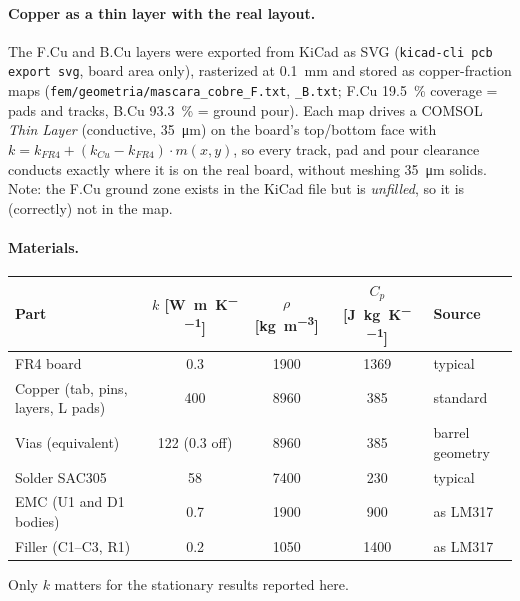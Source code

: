 \documentclass[11pt,letterpaper]{article}
\begin{document}
\paragraph{Copper as a thin layer with the real layout.} The F.Cu and B.Cu layers were exported from KiCad
as SVG (\texttt{kicad-cli pcb export svg}, board area only), rasterized at \SI{0.1}{\milli\meter} and
stored as copper-fraction maps (\nolinkurl{fem/geometria/mascara_cobre_F.txt}, \texttt{\_B.txt}; F.Cu
\SI{19.5}{\percent} coverage = pads and tracks, B.Cu \SI{93.3}{\percent} = ground pour). Each map drives a
COMSOL \textit{Thin Layer} (conductive, \SI{35}{\micro\meter}) on the board's top/bottom face with
$k = k_{FR4} + (k_{Cu}-k_{FR4})\cdot m(x,y)$, so every track, pad and pour clearance conducts exactly where
it is on the real board, without meshing \SI{35}{\micro\meter} solids. Note: the F.Cu ground zone exists
in the KiCad file but is \emph{unfilled}, so it is (correctly) not in the map.

\paragraph{Materials.}
\begin{center}
\small
\begin{tabular}{@{}lccc l@{}}
\toprule
Part & $k$ [\si{\watt\per\meter\per\kelvin}] & $\rho$ [\si{\kilogram\per\cubic\meter}] & $C_p$ [\si{\joule\per\kilogram\per\kelvin}] & Source \\
\midrule
FR4 board & 0.3 & 1900 & 1369 & typical \\
Copper (tab, pins, layers, L pads) & 400 & 8960 & 385 & standard \\
Vias (equivalent) & 122 (0.3 off) & 8960 & 385 & barrel geometry \\
Solder SAC305 & 58 & 7400 & 230 & typical \\
EMC (U1 and D1 bodies) & 0.7 & 1900 & 900 & as LM317 \\
Filler (C1--C3, R1) & 0.2 & 1050 & 1400 & as LM317 \\
\bottomrule
\end{tabular}
\end{center}
Only $k$ matters for the stationary results reported here.
\end{document}
